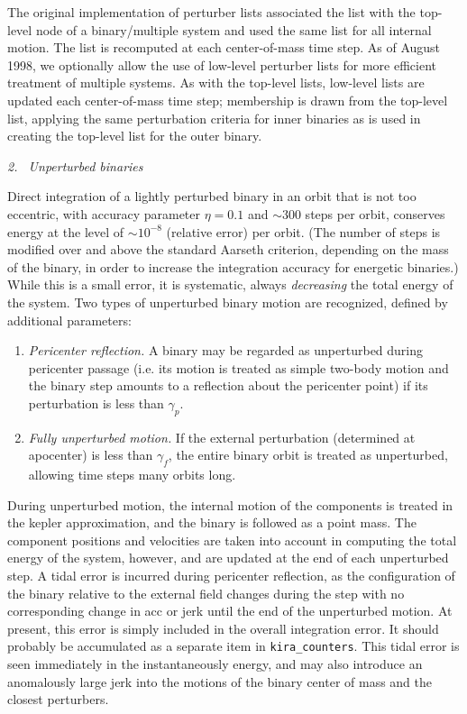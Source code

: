 \documentclass{article}
\begin{document}
The original implementation of perturber lists associated the list
with the top-level node of a binary/multiple system and used the same
list for all internal motion.  The list is recomputed at each
center-of-mass time step.  As of August 1998, we optionally allow the
use of low-level perturber lists for more efficient treatment of
multiple systems.  As with the top-level lists, low-level lists are
updated each center-of-mass time step; membership is drawn from the
top-level list, applying the same perturbation criteria for inner
binaries as is used in creating the top-level list for the outer
binary.

\bigskip\bigskip\noindent
{\large\it 2.~ Unperturbed binaries}

\bigskip\noindent Direct integration of a lightly perturbed binary in
an orbit that is not too eccentric, with accuracy parameter $\eta =
0.1$ and $\sim 300$ steps per orbit, conserves energy at the level of
$\sim10^{-8}$ (relative error) per orbit.  (The number of steps is
modified over and above the standard Aarseth criterion, depending on
the mass of the binary, in order to increase the integration accuracy
for energetic binaries.)  While this is a small error, it is
systematic, always {\it decreasing} the total energy of the system.
Two types of unperturbed binary motion are recognized, defined by
additional parameters:

\begin{enumerate}

\item	{\it Pericenter reflection.}  A binary may be regarded as
	unperturbed during pericenter passage (i.e. its motion is
	treated as simple two-body motion and the binary step amounts
	to a reflection about the pericenter point) if its
	perturbation is less than $\gamma_p$.

\item	{\it Fully unperturbed motion.}  If the external perturbation
	(determined at apocenter) is less than $\gamma_f$, the entire
	binary orbit is treated as unperturbed, allowing time steps
	many orbits long.

\end{enumerate}

During unperturbed motion, the internal motion of the components is
treated in the kepler approximation, and the binary is followed as a
point mass.  The component positions and velocities are taken into
account in computing the total energy of the system, however, and are
updated at the end of each unperturbed step.  A tidal error is incurred
during pericenter reflection, as the configuration of the binary
relative to the external field changes during the step with no
corresponding change in acc or jerk until the end of the unperturbed
motion.  At present, this error is simply included in the overall
integration error.  It should probably be accumulated as a separate
item in {\tt kira\_counters}.  This tidal error is seen immediately in
the instantaneously energy, and may also introduce an anomalously
large jerk into the motions of the binary center of mass and the
closest perturbers.
\end{document}
